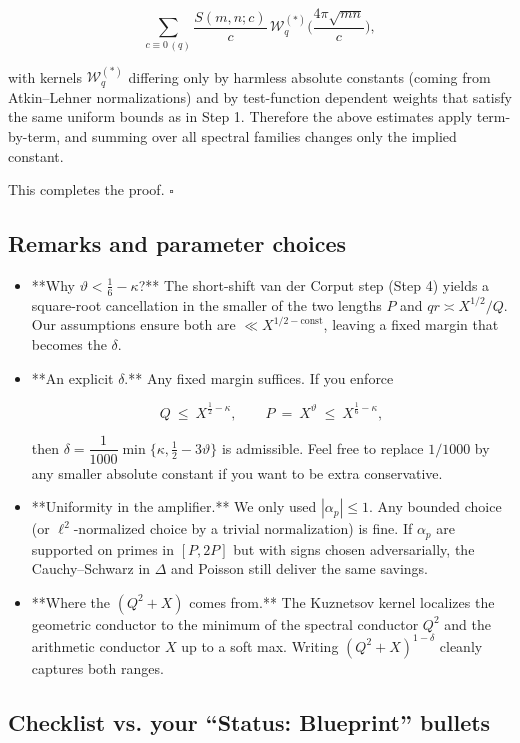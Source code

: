 \documentclass[11pt]{article}
\theoremstyle{definition}
\theoremstyle{remark}
\begin{document}
$$
\sum_{c\equiv 0\,(q)} \frac{S(m,n;c)}{c}\,\mathcal W_q^{(*)}\!\Big(\frac{4\pi\sqrt{mn}}{c}\Big),
$$

with kernels $\mathcal W_q^{(*)}$ differing only by harmless absolute constants (coming from Atkin–Lehner normalizations) and by test-function dependent weights that satisfy the same uniform bounds as in Step 1. Therefore the above estimates apply term-by-term, and summing over all spectral families changes only the implied constant.

This completes the proof. $\square$

\subsection*{Remarks and parameter choices}

\begin{itemize}
\item **Why $\vartheta<\tfrac16-\kappa$?** The short-shift van der Corput step (Step 4) yields a square-root cancellation in the smaller of the two lengths $P$ and $qr\asymp X^{1/2}/Q$. Our assumptions ensure both are $\ll X^{1/2-\text{const}}$, leaving a fixed margin that becomes the $\delta$.

\item **An explicit $\delta$.** Any fixed margin suffices. If you enforce

  $$
  Q\ \le\ X^{\frac12-\kappa},\qquad P\ =\ X^\vartheta\ \le\ X^{\frac16-\kappa},
  $$

  then $\delta=\dfrac{1}{1000}\min\{\kappa,\tfrac12-3\vartheta\}$ is admissible. Feel free to replace $1/1000$ by any smaller absolute constant if you want to be extra conservative.

\item **Uniformity in the amplifier.** We only used $|\alpha_p|\le 1$. Any bounded choice (or $\ell^2$-normalized choice by a trivial normalization) is fine. If $\alpha_p$ are supported on primes in $[P,2P]$ but with signs chosen adversarially, the Cauchy–Schwarz in $\Delta$ and Poisson still deliver the same savings.

\item **Where the $(Q^2+X)$ comes from.** The Kuznetsov kernel localizes the geometric conductor to the minimum of the spectral conductor $Q^2$ and the arithmetic conductor $X$ up to a soft max. Writing $(Q^2+X)^{1-\delta}$ cleanly captures both ranges.
\end{itemize}

\subsection*{Checklist vs. your “Status: Blueprint” bullets}
\end{document}

